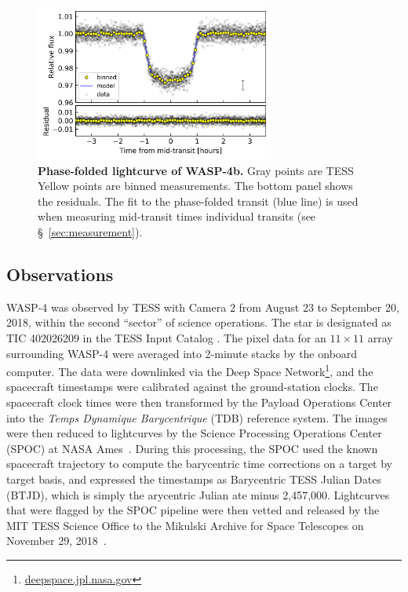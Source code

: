 \documentclass[12pt,twocolumn,tighten]{aastex62}
\begin{document}
\begin{figure}[t]
    \begin{center}
        \includegraphics[width=0.7\textwidth]{f2.png}
    \end{center}
    \vspace{-0.7cm}
    \caption{
        {\bf Phase-folded lightcurve of WASP-4b.} Gray points are
        TESS  
        Yellow points are binned measurements.  The bottom
        panel shows the residuals.  The fit to the phase-folded
        transit (blue line) is used when measuring mid-transit times
         individual transits (see 
        \S~\ref{sec:measurement}).
        \label{fig:phasefold}
    }
\end{figure}

\subsection{Observations}

WASP-4 was observed by TESS with Camera 2 from August 23 to September
20, 2018, within the second ``sector'' of science operations.  The
star is designated as TIC 402026209 in the TESS Input Catalog
\citep{stassun_TIC_2018}.  The pixel data for an $11\times11$ array
surrounding WASP-4 were averaged into 2-minute stacks by the onboard
computer.  The data were downlinked via the Deep Space
Network\footnote{\url{deepspace.jpl.nasa.gov}}, and the
spacecraft timestamps were calibrated against the ground-station
clocks.  The spacecraft clock times were then transformed by the
Payload Operations Center into the {\it Temps Dynamique Barycentrique}
(TDB) reference system.  The images were then reduced to lightcurves
by the Science Processing Operations Center (SPOC) at NASA
Ames~\citep{jenkins_tess_2016}.  During this processing, the SPOC used
the known spacecraft trajectory to compute the barycentric time
corrections on a target by target basis, and expressed the timestamps
as Barycentric TESS Julian Dates (BTJD), which is simply the
arycentric Julian ate minus
2{,}457{,}000.  Lightcurves that were flagged  by the SPOC pipeline  were then vetted and released by the MIT TESS
Science Office to the Mikulski Archive for Space Telescopes on
November 29, 2018~\citep{ricker_tess_alerts_2018}.
\end{document}
